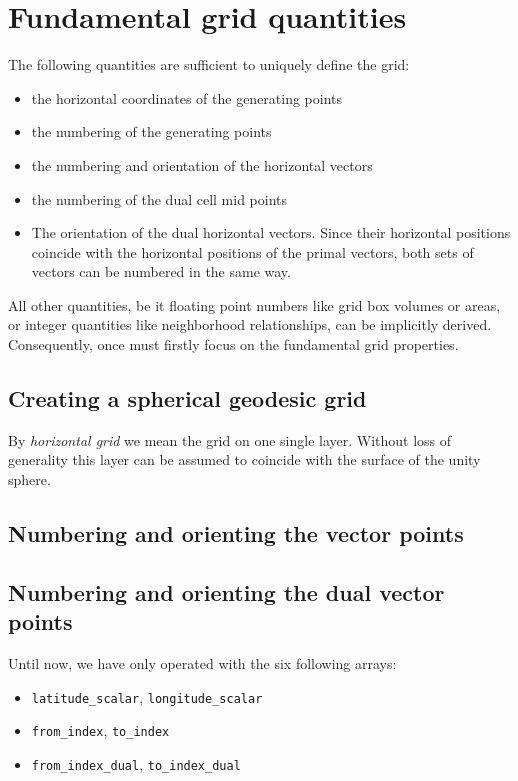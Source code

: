 \documentclass[10pt]{report}
\begin{document}
\section{Fundamental grid quantities}
\label{sec:fundamental_grid_quantities}

The following quantities are sufficient to uniquely define the grid:

\begin{itemize}
\item the horizontal coordinates of the generating points
\item the numbering of the generating points
\item the numbering and orientation of the horizontal vectors
\item the numbering of the dual cell mid points
\item The orientation of the dual horizontal vectors. Since their horizontal positions coincide with the horizontal positions of the primal vectors, both sets of vectors can be numbered in the same way.
\end{itemize}
%
All other quantities, be it floating point numbers like grid box volumes or areas, or integer quantities like neighborhood relationships, can be implicitly derived. Consequently, once must firstly focus on the fundamental grid properties.

\subsection{Creating a spherical geodesic grid}
\label{sec:creating_a_spherical_geodesic_grid}

By \textit{horizontal grid} we mean the grid on one single layer. Without loss of generality this layer can be assumed to coincide with the surface of the unity sphere.

\subsection{Numbering and orienting the vector points}
\label{sec:numbering_and_orienting_the_vector_points}

\subsection{Numbering and orienting the dual vector points}
\label{sec:numbering_and_orienting_the_dual_vector_points}

Until now, we have only operated with the six following arrays:
%
\begin{itemize}
\item \texttt{latitude\_scalar}, \texttt{longitude\_scalar}
\item \texttt{from\_index}, \texttt{to\_index}
\item \texttt{from\_index\_dual}, \texttt{to\_index\_dual}
\end{itemize}
%
\end{document}
